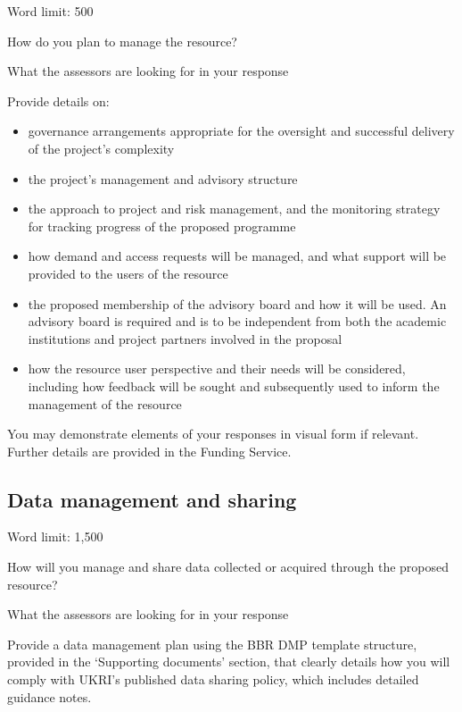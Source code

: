 \documentclass[11pt]{article}
\newenvironment{instruction}{%
    \begin{tcolorbox}[breakable,colback=red!5,colframe=red,title=Instruction]%
	}{%
    	\end{tcolorbox}%
	}
\begin{document}
\begin{instruction}

Word limit: 500

How do you plan to manage the resource?

What the assessors are looking for in your response

Provide details on:

\begin{itemize}

	\item governance arrangements appropriate for the oversight and successful
delivery of the project’s complexity

	\item the project’s management and advisory structure

	\item the approach to project and risk management, and the monitoring
strategy for tracking progress of the proposed programme

	\item how demand and access requests will be managed, and what support will
be provided to the users of the resource

	\item the proposed membership of the advisory board and how it will be
used. An advisory board is required and is to be independent from both the
academic institutions and project partners involved in the proposal

	\item how the resource user perspective and their needs will be considered,
including how feedback will be sought and subsequently used to inform the
management of the resource

\end{itemize}

You may demonstrate elements of your responses in visual form if relevant.
Further details are provided in the Funding Service.

\end{instruction}

\pagebreak
\subsection{Data management and sharing}

\begin{instruction}

Word limit: 1,500

How will you manage and share data collected or acquired through the
proposed resource?

What the assessors are looking for in your response

Provide a data management plan using the BBR DMP template structure,
provided in the ‘Supporting documents’ section, that clearly details how you will
comply with UKRI’s published data sharing policy, which includes detailed
guidance notes.

\end{instruction}
\end{document}
